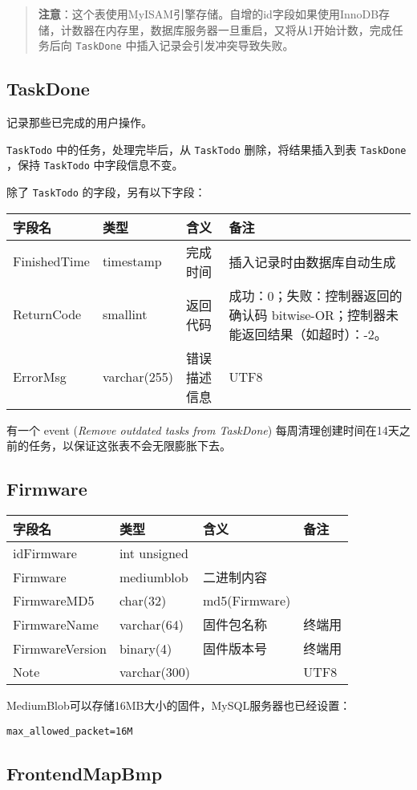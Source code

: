 \begin{quote}
\textbf{注意}：这个表使用MyISAM引擎存储。自增的id字段如果使用InnoDB存储，计数器在内存里，数据库服务器一旦重启，又将从1开始计数，完成任务后向
\texttt{TaskDone} 中插入记录会引发冲突导致失败。
\end{quote}

\subsection{TaskDone}\label{taskdone}

记录那些已完成的用户操作。

\texttt{TaskTodo} 中的任务，处理完毕后，从 \texttt{TaskTodo}
删除，将结果插入到表 \texttt{TaskDone} ，保持 \texttt{TaskTodo}
中字段信息不变。

除了 \texttt{TaskTodo} 的字段，另有以下字段：

\begin{longtabu}[c]{@{}lXXX@{}}
\toprule
字段名 & 类型 & 含义 & 备注\tabularnewline
\midrule
\endhead
FinishedTime & timestamp & 完成时间 &
插入记录时由数据库自动生成\tabularnewline
ReturnCode & smallint & 返回代码 & 成功：0；失败：控制器返回的确认码
bitwise-OR；控制器未能返回结果（如超时）：-2。\tabularnewline
ErrorMsg & varchar(255) & 错误描述信息 & UTF8\tabularnewline
\bottomrule
\end{longtabu}

有一个 event (\emph{Remove outdated tasks from TaskDone})
每周清理创建时间在14天之前的任务，以保证这张表不会无限膨胀下去。

\subsection{Firmware}\label{firmware}

\begin{longtabu}[c]{@{}lXXX@{}}
\toprule
字段名 & 类型 & 含义 & 备注\tabularnewline
\midrule
\endhead
idFirmware & int unsigned & &\tabularnewline
Firmware & mediumblob & 二进制内容 &\tabularnewline
FirmwareMD5 & char(32) & md5(Firmware) &\tabularnewline
FirmwareName & varchar(64) & 固件包名称 & 终端用\tabularnewline
FirmwareVersion & binary(4) & 固件版本号 & 终端用\tabularnewline
Note & varchar(300) & & UTF8\tabularnewline
\bottomrule
\end{longtabu}

MediumBlob可以存储16MB大小的固件，MySQL服务器也已经设置：

\texttt{max\_allowed\_packet=16M}

\subsection{FrontendMapBmp}\label{frontendmapbmp}

